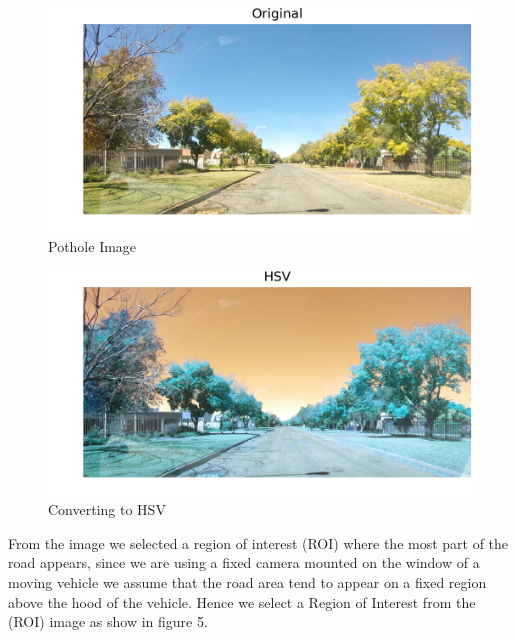 \documentclass[journal]{IEEEtran}
\begin{document}
\vspace{0.5cm}

\begin{figure}[!htb]
\begin{center}
\includegraphics[scale=1]{Images/0_Original.png}
\end{center}
\caption{Pothole Image}
\end{figure}


\begin{figure}[!htb]
\begin{center}
\includegraphics[scale=1]{Images/1_HSV.png}
\end{center}
\caption{Converting to HSV}
\end{figure}

\vspace{0.5cm}

\noindent From the image we selected a region of interest (ROI) where the most part of the road appears, since we are using a fixed camera mounted on the window of a moving vehicle we assume that the road area tend to appear on a fixed region above the hood of the vehicle. Hence we select a Region of Interest from the (ROI) image as show in figure 5.
\end{document}
